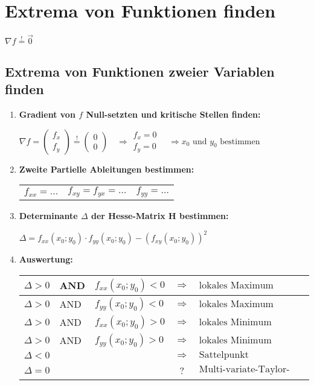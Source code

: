 \newpage
\section{Extrema von Funktionen finden}
 $\nabla f \stackrel{!}{=} \vec{0}$

\subsection{Extrema von Funktionen zweier Variablen finden}
\begin{enumerate}[itemsep=1ex]
    \item \textbf{Gradient von $f$ Null-setzten und kritische Stellen finden:}

    $\nabla f=
    \begin{pmatrix}
        f_x\\
        f_y
    \end{pmatrix} \stackrel{!}{=}
    \begin{pmatrix}
        0\\
        0
    \end{pmatrix}
    \, \, \, \, \, \,
    \Rightarrow 
    \begin{matrix}
        f_{x}=0\\
        f_{y}=0
    \end{matrix}
    \, \, \, \, \, \,
    \Rightarrow
    x_0 \text{ und } y_0 \text{ bestimmen}$

    \item \textbf{Zweite Partielle Ableitungen bestimmen:}
        
    \begin{tabular}{lll}
        $f_{xx} = \dots$ & $f_{xy} = f_{yx} = \dots$ & $f_{yy} = \dots$ \\
    \end{tabular}

    \item \textbf{Determinante $\Delta$ der Hesse-Matrix H bestimmen:}
    
    $\Delta = f_{xx}(x_0;y_0) \cdot f_{yy}(x_0;y_0) - \left(f_{xy}(x_0;y_0)\right)^2 $

    \item \textbf{Auswertung:}
    
    \begin{tabular}{lllcl}
        \hline
        $\Delta > 0$ &AND& $f_{xx}(x_0;y_0) < 0$ &$\Longrightarrow$& $\text{lokales Maximum}$\\
        \hline
        $\Delta > 0$ &AND& $f_{yy}(x_0;y_0) < 0$ &$\Longrightarrow$& $\text{lokales Maximum}$\\
        \hline
        $\Delta > 0$ &AND& $f_{xx}(x_0;y_0) > 0$ &$\Longrightarrow$& $\text{lokales Minimum}$\\
        \hline
        $\Delta > 0$ &AND& $f_{yy}(x_0;y_0) > 0$ &$\Longrightarrow$& $\text{lokales Minimum}$\\
        \hline
        $\Delta < 0$ &&&$\Longrightarrow$& $\text{Sattelpunkt}$\\
        \hline
        $\Delta = 0$ &&&?& $\text{Multi-variate-Taylor-logik ...}$\\
        \hline
    \end{tabular}


\end{enumerate}
